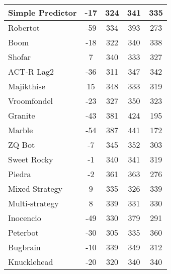 \begin{table*}
\begin{tabular}{|l|c|c|c|c|}
Simple Predictor & -17 & 324 & 341 & 335 \\ \hline 
Robertot & -59 & 334 & 393 & 273 \\ \hline 
Boom & -18 & 322 & 340 & 338 \\ \hline 
Shofar & 7 & 340 & 333 & 327 \\ \hline 
ACT-R Lag2 & -36 & 311 & 347 & 342 \\ \hline 
Majikthise & 15 & 348 & 333 & 319 \\ \hline 
Vroomfondel & -23 & 327 & 350 & 323 \\ \hline 
Granite & -43 & 381 & 424 & 195 \\ \hline 
Marble & -54 & 387 & 441 & 172 \\ \hline 
ZQ Bot & -7 & 345 & 352 & 303 \\ \hline 
Sweet Rocky & -1 & 340 & 341 & 319 \\ \hline 
Piedra & -2 & 361 & 363 & 276 \\ \hline 
Mixed Strategy & 9 & 335 & 326 & 339 \\ \hline 
Multi-strategy & 8 & 339 & 331 & 330 \\ \hline 
Inocencio & -49 & 330 & 379 & 291 \\ \hline 
Peterbot & -30 & 305 & 335 & 360 \\ \hline 
Bugbrain & -10 & 339 & 349 & 312 \\ \hline 
Knucklehead & -20 & 320 & 340 & 340 \\ \hline
        \end{tabular}
    \end{table*}